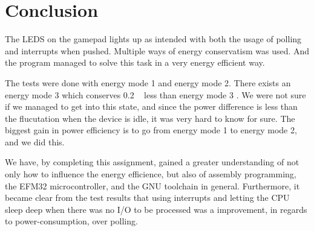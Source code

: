 \section{Conclusion}

The LEDS on the gamepad lights up as intended with both the usage of polling and interrupts when pushed. Multiple ways of energy conservatism was used. And the program managed to solve this task in a very energy efficient way.

The tests were done with energy mode 1 and energy mode 2. There exists an energy mode 3 which conserves 0.2 \si{\mikro\Ampere} less than energy mode 3 \cite{efm32gg-ref-man}. We were not sure if we managed to get into this state, and since the power difference is less than the flucutation when the device is idle, it was very hard to know for sure. The biggest gain in power efficiency is to go from energy mode 1 to energy mode 2, and we did this.

We have, by completing this assignment, gained a greater understanding of not only how to influence the energy efficience, but also of assembly programming, the EFM32 microcontroller, and the GNU toolchain in general. Furthermore, it became clear from the test results that using interrupts and letting the CPU sleep deep when there was no I/O to be processed was a improvement, in regards to power-consumption, over polling.
